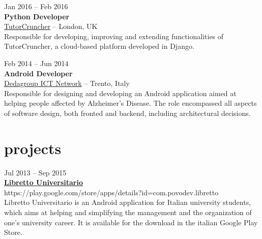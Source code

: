 \documentclass[]{friggeri-cv} %
\begin{document}

{Jan 2016 -- Feb 2016} \\
{\textbf{Python Developer}} \\
{\href{http://www.tutorcruncher.com}{TutorCruncher}} -- {London, UK} \\
{Responsible for developing, improving and extending functionalities of TutorCruncher, a cloud-based platform developed in Django.}

{Feb 2014 -- Jun 2014} \\
{\textbf{Android Developer}} \\
{\href{http://www.dedagroup.it}{Dedagroup ICT Network}} -- {Trento, Italy} \\
{Responsible for designing and developing an Android application aimed at helping people affected by Alzheimer's Disease. The role encompassed all aspects of software design, both fronted and backend, including architectural decisions.}





\section{projects}

{Jul 2013 -- Sep 2015} \\
{\href{https://play.google.com/store/apps/details?id=com.povodev.libretto}{\textbf{Libretto Universitario}}} \\
{https://play.google.com/store/apps/details?id=com.povodev.libretto} \\
{Libretto Universitario is an Android application for Italian university students, which aims at helping and simplifying the management and the organization of one's university career. It is available for the download in the italian Google Play Store.}
\end{document}
